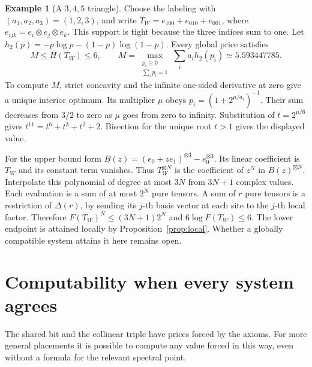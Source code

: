 \documentclass[11pt,letterpaper]{article}
\theoremstyle{definition}
\newtheorem{example}[theorem]{Example}
\begin{document}
\begin{example}[A \(3,4,5\) triangle]\label{ex:w}
Choose the labeling with \((a_1,a_2,a_3)=(1,2,3)\), and write
\(T_W=e_{100}+e_{010}+e_{001}\), where
\(e_{ijk}=e_i\otimes e_j\otimes e_k\). This support is tight because
the three indices sum to one. Let \(h_2(p)=-p\log p-(1-p)\log(1-p)\).
Every global price satisfies
\begin{equation}
 M\le H(T_W)\le6,\qquad
 M=\max_{\substack{p_i\ge0\\\sum_i p_i=1}}\sum_i a_i h_2(p_i)
   \simeq 5.593447785 .
 \label{eq:triangle-gap}
\end{equation}
To compute \(M\), strict concavity and the infinite one-sided derivative
at zero give a unique interior optimum. Its multiplier \(\mu\) obeys
\(p_i=(1+2^{\mu/a_i})^{-1}\). Their sum decreases from \(3/2\) to zero
as \(\mu\) goes from zero to infinity. Substitution of \(t=2^{\mu/6}\)
gives \(t^{11}=t^6+t^3+t^2+2\). Bisection for the unique root \(t>1\)
gives the displayed value.

For the upper bound form
\(B(z)=(e_0+ze_1)^{\otimes3}-e_0^{\otimes3}\).
Its linear coefficient is \(T_W\) and its constant term vanishes. Thus
\(T_W^{\boxtimes N}\) is the coefficient of \(z^N\) in \(B(z)^{\boxtimes N}\).
Interpolate this polynomial of degree at most \(3N\) from \(3N+1\)
complex values. Each evaluation is a sum of at most \(2^N\) pure
tensors. A sum of \(r\) pure tensors is a restriction of \(\Delta(r)\),
by sending its \(j\)-th basis vector at each site to the \(j\)-th local
factor. Therefore \(F(T_W)^N\le(3N+1)2^N\) and \(6\log F(T_W)\le6\).
The lower endpoint is attained locally by Proposition~\ref{prop:local}.
Whether a globally compatible system attains it here remains open.
\end{example}

\section{Computability when every system agrees}
\label{sec:compact}

The shared bit and the collinear triple have prices forced by the axioms.
For more general placements it is possible to compute any value forced in
this way, even without a formula for the relevant spectral point.
\end{document}
